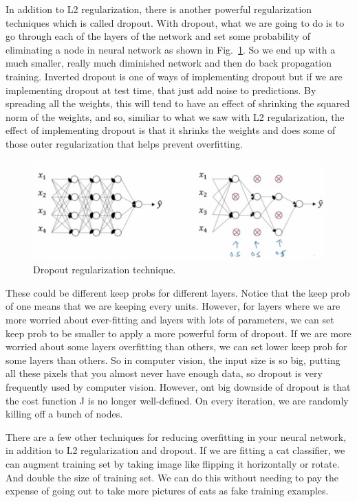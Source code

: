 \documentclass[a4paper]{article}
\begin{document}
In addition to L2 regularization, there is another powerful regularization techniques which is called dropout. With dropout, what we are going to do is to go through each of the layers of the network and set some probability of eliminating a node in neural network as shown in Fig.~\ref{p11}. So we end up with a much smaller, really much diminished network and then do back propagation training. Inverted dropout is one of ways of implementing dropout but if we are implementing dropout at test time, that just add noise to predictions. By spreading all the weights, this will tend to have an effect of shrinking the squared norm of the weights, and so, similiar to what we saw with L2 regularization, the effect of implementing dropout is that it shrinks the weights and does some of those outer regularization that helps prevent overfitting. 
\begin{figure}
	\begin{center}
		\includegraphics[scale=0.3]{figures/12.png}
	\end{center}
	\caption{Dropout regularization technique.}
	\label{p11}
\end{figure}
These could be different keep probs for different layers. Notice that the keep prob of one means that we are keeping every units. However, for layers where we are more worried about ever-fitting and layers with lots of parameters, we can set keep prob to be smaller to apply a more powerful form of dropout. If we are more worried about some layers overfitting than others, we can set lower keep prob for some layers than others. So in computer vision, the input size is so big, putting all these pixels that you almost never have enough data, so dropout is very frequently used by computer vision. However, ont big downside of dropout is that the cost function J is no longer well-defined. On every iteration, we are randomly killing off a bunch of nodes.

There are a few other techniques for reducing overfitting in your neural network, in addition to L2 regularization and dropout. If we are fitting a cat classifier, we can augment training set by taking image like flipping it horizontally or rotate. And double the size of training set. We can do this without needing to pay the expense of going out to take more pictures of cats as fake training examples. 
\end{document}
